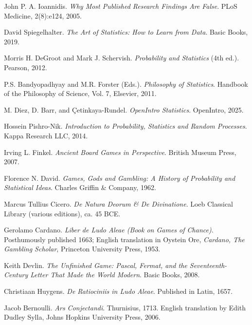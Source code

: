 \documentclass{book}
\begin{document}
\begin{thebibliography}{999}


John P. A. Ioannidis.
\textit{Why Most Published Research Findings Are False}.
PLoS Medicine, 2(8):e124, 2005.

David Spiegelhalter. 
\textit{The Art of Statistics: How to Learn from Data}. 
Basic Books, 2019.

Morris H. DeGroot and Mark J. Schervish.
\textit{Probability and Statistics} (4th ed.).
Pearson, 2012.

P.S. Bandyopadhyay and M.R. Forster (Eds.).
\textit{Philosophy of Statistics}.
Handbook of the Philosophy of Science, Vol. 7, Elsevier, 2011.

M. Diez, D. Barr, and Çetinkaya-Rundel.
\textit{OpenIntro Statistics}.
OpenIntro, 2025.

Hossein Pishro-Nik.
\textit{Introduction to Probability, Statistics and Random Processes}.
Kappa Research LLC, 2014.

Irving L. Finkel.  
\textit{Ancient Board Games in Perspective}.  
British Museum Press, 2007.

Florence N. David.  
\textit{Games, Gods and Gambling: A History of Probability and Statistical Ideas}.  
Charles Griffin \& Company, 1962.

Marcus Tullius Cicero.  
\textit{De Natura Deorum \& De Divinatione}.  
Loeb Classical Library (various editions), ca. 45 BCE.

Gerolamo Cardano.  
\textit{Liber de Ludo Aleae (Book on Games of Chance)}.  
Posthumously published 1663; English translation in Oystein Ore, \textit{Cardano, The Gambling Scholar}, Princeton University Press, 1953.

Keith Devlin.  
\textit{The Unfinished Game: Pascal, Fermat, and the Seventeenth-Century Letter That Made the World Modern}.  
Basic Books, 2008.

Christiaan Huygens.  
\textit{De Ratiociniis in Ludo Aleae}.  
Published in Latin, 1657.

Jacob Bernoulli.  
\textit{Ars Conjectandi}.  
Thurnisius, 1713. English translation by Edith Dudley Sylla, Johns Hopkins University Press, 2006.


\end{thebibliography}
\end{document}
